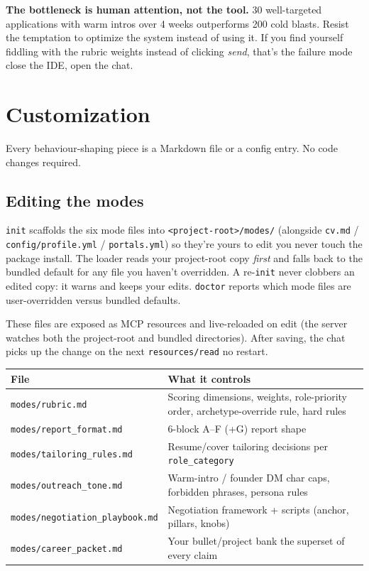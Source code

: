 \documentclass[11pt,letterpaper]{article}
\newcommand{\tool}[1]{\texttt{#1}}
\newcommand{\fpath}[1]{\texttt{#1}}
\begin{document}
\medskip

\begin{notebox}
\textbf{The bottleneck is human attention, not the tool.} 30 well-targeted applications with warm intros over 4 weeks outperforms 200 cold blasts. Resist the temptation to optimize the system instead of using it. If you find yourself fiddling with the rubric weights instead of clicking \emph{send}, that's the failure mode \textemdash{} close the IDE, open the chat.
\end{notebox}

\section{Customization}\label{sec:custom}

Every behaviour-shaping piece is a Markdown file or a config entry. No code changes required.

\subsection*{Editing the modes}

\texttt{init} scaffolds the six mode files into \fpath{<project-root>/modes/} (alongside \fpath{cv.md} / \fpath{config/profile.yml} / \fpath{portals.yml}) so they're yours to edit \textemdash{} you never touch the package install. The loader reads your project-root copy \emph{first} and falls back to the bundled default for any file you haven't overridden. A re-\texttt{init} never clobbers an edited copy: it warns and keeps your edits. \tool{doctor} reports which mode files are user-overridden versus bundled defaults.

These files are exposed as MCP resources and live-reloaded on edit (the server watches both the project-root and bundled directories). After saving, the chat picks up the change on the next \texttt{resources/read} \textemdash{} no restart.

\begin{center}
\small
\begin{tabularx}{\linewidth}{l X}
\toprule
\rowcolor{accent!10}\textbf{File} & \textbf{What it controls} \\
\midrule
\fpath{modes/rubric.md}                & Scoring dimensions, weights, role-priority order, archetype-override rule, hard rules \\
\fpath{modes/report\_format.md}        & 6-block A--F (+G) report shape \\
\fpath{modes/tailoring\_rules.md}      & Resume/cover tailoring decisions per \texttt{role\_category} \\
\fpath{modes/outreach\_tone.md}        & Warm-intro / founder DM char caps, forbidden phrases, persona rules \\
\fpath{modes/negotiation\_playbook.md} & Negotiation framework + scripts (anchor, pillars, knobs) \\
\fpath{modes/career\_packet.md}        & Your bullet/project bank \textemdash{} the superset of every claim \\
\bottomrule
\end{tabularx}
\end{center}
\end{document}

